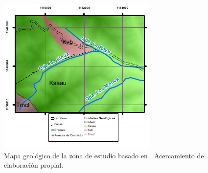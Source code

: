 \begin{figure}[H]
\centering
\includegraphics[scale=3]{img/geologia.pdf}
\caption{Mapa geol\'ogico de la zona de estudio basado en \cite{geol}. Acercamiento de elaboraci\'on propial.   }
\label{fig:mapageo}
\end{figure}


